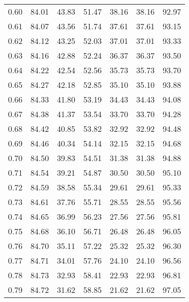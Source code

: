 \begin{tabular}{|c|c|c|c|c|c|c|}
      0.60 &     84.01 &     43.83 &      51.47 &   38.16 &      38.16 &         92.97 \\
      0.61 &     84.07 &     43.56 &      51.74 &   37.61 &      37.61 &         93.15 \\
      0.62 &     84.12 &     43.25 &      52.03 &   37.01 &      37.01 &         93.33 \\
      0.63 &     84.16 &     42.88 &      52.24 &   36.37 &      36.37 &         93.50 \\
      0.64 &     84.22 &     42.54 &      52.56 &   35.73 &      35.73 &         93.70 \\
      0.65 &     84.27 &     42.18 &      52.85 &   35.10 &      35.10 &         93.88 \\
      0.66 &     84.33 &     41.80 &      53.19 &   34.43 &      34.43 &         94.08 \\
      0.67 &     84.38 &     41.37 &      53.54 &   33.70 &      33.70 &         94.28 \\
      0.68 &     84.42 &     40.85 &      53.82 &   32.92 &      32.92 &         94.48 \\
      0.69 &     84.46 &     40.34 &      54.14 &   32.15 &      32.15 &         94.68 \\
      0.70 &     84.50 &     39.83 &      54.51 &   31.38 &      31.38 &         94.88 \\
      0.71 &     84.54 &     39.21 &      54.87 &   30.50 &      30.50 &         95.10 \\
      0.72 &     84.59 &     38.58 &      55.34 &   29.61 &      29.61 &         95.33 \\
      0.73 &     84.61 &     37.76 &      55.71 &   28.55 &      28.55 &         95.56 \\
      0.74 &     84.65 &     36.99 &      56.23 &   27.56 &      27.56 &         95.81 \\
      0.75 &     84.68 &     36.10 &      56.71 &   26.48 &      26.48 &         96.05 \\
      0.76 &     84.70 &     35.11 &      57.22 &   25.32 &      25.32 &         96.30 \\
      0.77 &     84.71 &     34.01 &      57.76 &   24.10 &      24.10 &         96.56 \\
      0.78 &     84.73 &     32.93 &      58.41 &   22.93 &      22.93 &         96.81 \\
      0.79 &     84.72 &     31.62 &      58.85 &   21.62 &      21.62 &         97.05 \\

\end{tabular}
